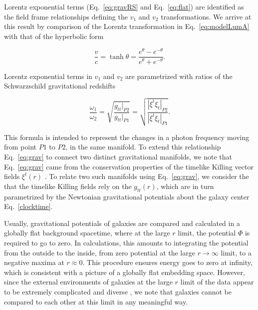\documentclass[reprint,%
 amsmath,amssymb,
 aps,
]{revtex4-1}
\begin{document}
  
    
    
Lorentz exponential terms (Eq.~\ref{eq:gravRS} and Eq.~\ref{eq:flat})
  are    identified  as the field frame relationships defining the $v_1$ and $v_2$ transformations. We arrive at this result  by  comparison of 
     the  Lorentz transformation in  Eq.~\ref{eq:modelLumA} with 
 that of the    hyperbolic form \cite{rindler2013essential} 


     \begin{equation}
         \frac{v}{c} = \tanh \theta = \frac{e^\theta - e^{-\theta}}{e^\theta + e^{-\theta}} .   
         \label{boost}
     \end{equation} 

 
 
 
 
 
Lorentz exponential terms in  $v_1$ and $v_2$ are parametrized with ratios of  the    Schwarzschild gravitational redshifts

\begin{equation}
       \frac{\omega_1}{\omega_2}  =\sqrt{\frac{g_{tt}|_{P2}}{g_{tt}|_{P1}}} =\sqrt{\frac{|\xi^t\xi_{t}|_{P2}}{|\xi^t\xi_{t}|_{P1}}}.
      \label{eq:grav}
    \end{equation} 
    
    This formula is    intended to represent the changes in a photon frequency moving from point $P1$ to $P2$,  in the same manifold. 
To extend this relationship Eq.~\ref{eq:grav} to connect 
  two distinct gravitational manifolds,  we    note that Eq.~\ref{eq:grav} came from  the conservation properties of  the timelike  Killing vector fields  
   $\xi^t(r)$  \cite{Wald}.   
   To relate two such manifolds using Eq.~\ref{eq:grav}, we consider the that 
 the  timelike Killing fields rely on  the
  $g_{tt}(r)$, 
  which are in  turn   parametrized by  the Newtonian  gravitational potentials about the galaxy center Eq.~\ref{clocktime}. 
  
 
   
 Usually, gravitational potentials of galaxies are compared and calculated in  a globally flat background spacetime, where at the large $r$ limit, the potential $\Phi$ is required  to go to zero. 
 In calculations, this amounts to integrating the potential from the outside to the inside, from zero potential at the large  $r \to \infty$ limit, to a negative maxima at   $r\approx 0$. 
This procedure  ensures   energy goes to zero at infinity, which is consistent with a picture of a globally flat embedding space.   However, since 
  the external environments of galaxies at the large $r$  limit of the data appear to be  extremely complicated  and diverse  \cite{Pomarede:2020pme,Hoffman:2017ako},   we 
  note that  galaxies cannot be compared to each other at this limit in any meaningful way.
\end{document}
